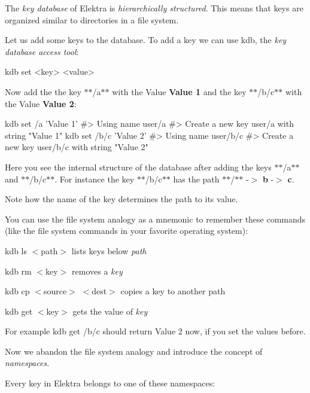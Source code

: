 The {\itshape key database} of Elektra is {\itshape hierarchically structured}. This means that keys are organized similar to directories in a file system.

Let us add some keys to the database. To add a key we can use {\ttfamily kdb}, the {\itshape key database access tool}\+:


\begin{DoxyCode}
kdb set <key> <value>
\end{DoxyCode}


Now add the the key $\ast$$\ast$/a$\ast$$\ast$ with the Value {\bfseries Value 1} and the key $\ast$$\ast$/b/c$\ast$$\ast$ with the Value {\bfseries Value 2}\+:


\begin{DoxyCode}
kdb set /a 'Value 1'
#> Using name user/a
#> Create a new key user/a with string "Value 1"
kdb set /b/c 'Value 2'
#> Using name user/b/c
#> Create a new key user/b/c with string "Value 2"
\end{DoxyCode}




Here you see the internal structure of the database after adding the keys $\ast$$\ast$/a$\ast$$\ast$ and $\ast$$\ast$/b/c$\ast$$\ast$. For instance the key $\ast$$\ast$/b/c$\ast$$\ast$ has the path $\ast$$\ast$/$\ast$$\ast$ -\/$>$ {\bfseries b} -\/$>$ {\bfseries c}.

Note how the name of the key determines the path to its value.

You can use the file system analogy as a mnemonic to remember these commands (like the file system commands in your favorite operating system)\+:


\begin{DoxyItemize}
\item {\ttfamily kdb ls $<$path$>$} lists keys below {\itshape path}
\item {\ttfamily kdb rm $<$key$>$} removes a {\itshape key}
\item {\ttfamily kdb cp $<$source$>$ $<$dest$>$} copies a key to another path
\item {\ttfamily kdb get $<$key$>$} gets the value of {\itshape key}
\end{DoxyItemize}

For example {\ttfamily kdb get /b/c} should return {\ttfamily Value 2} now, if you set the values before.

Now we abandon the file system analogy and introduce the concept of {\itshape namespaces}.

Every key in Elektra belongs to one of these namespaces\+:



